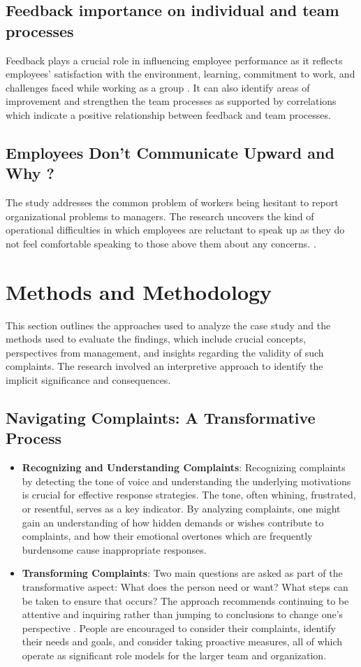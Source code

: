 \documentclass[a4paper,12pt]{article}
\begin{document}
\subsection{Feedback importance on individual and team processes}
Feedback plays a crucial role in influencing employee performance as it reflects employees' satisfaction with the environment, learning, commitment to work, and challenges faced while working as a group \cite{feedback_importance}. It can also identify areas of improvement and strengthen the team processes as supported by correlations which indicate a positive relationship between feedback and team processes. 
\subsection{Employees Don’t Communicate Upward and Why ?}
The study addresses the common problem of workers being hesitant to report organizational problems to managers. The research uncovers the kind of operational difficulties in which employees are reluctant to speak up as they do not feel comfortable speaking to those above them about any concerns. \cite{employee_silence}. 
\newpage
\section{Methods and Methodology}
This section outlines the approaches used to analyze the case study and the methods used to evaluate the findings, which include crucial concepts, perspectives from management, and insights regarding the validity of such complaints. The research involved an interpretive approach to identify the implicit significance and consequences.

\subsection{Navigating Complaints: A Transformative Process }
\begin{itemize}
    \item \textbf{Recognizing and Understanding Complaints}: Recognizing complaints by detecting the tone of voice and understanding the underlying motivations is crucial for effective response strategies.  The tone, often whining, frustrated, or resentful, serves as a key indicator\cite{complaint_to_opportunities}.  By analyzing complaints, one might gain an understanding of how hidden demands or wishes contribute to complaints, and how their emotional overtones which are frequently burdensome cause inappropriate responses.
    \item \textbf{Transforming Complaints}: Two main questions are asked as part of the transformative aspect: What does the person need or want? What steps can be taken to ensure that occurs? The approach recommends continuing to be attentive and inquiring rather than jumping to conclusions to change one's perspective \cite{complaint_to_opportunities}. People are encouraged to consider their complaints, identify their needs and goals, and consider taking proactive measures, all of which operate as significant role models for the larger team and organization.
\end{itemize}
\end{document}
